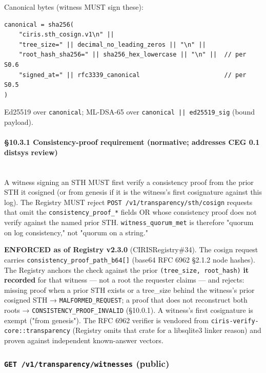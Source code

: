 \documentclass[11pt]{article}
\begin{document}
Canonical bytes (witness MUST sign these):


\begin{lstlisting}
canonical = sha256(
    "ciris.sth_cosign.v1\n" ||
    "tree_size=" || decimal_no_leading_zeros || "\n" ||
    "root_hash_sha256=" || sha256_hex_lowercase || "\n" ||  // per S0.6
    "signed_at=" || rfc3339_canonical                       // per S0.5
)
\end{lstlisting}

Ed25519 over \texttt{canonical}; ML-DSA-65 over \texttt{canonical || ed25519\_sig} (bound payload).


\paragraph{§10.3.1 Consistency-proof requirement (normative; addresses CEG 0.1 distsys review)}\mbox{}\\


A witness signing an STH MUST first verify a consistency proof from the prior STH it cosigned (or from genesis if it is the witness's first cosignature against this log). The Registry MUST reject \texttt{POST /v1/transparency/sth/cosign} requests that omit the \texttt{consistency\_proof\_*} fields OR whose consistency proof does not verify against the named prior STH. \texttt{witness\_quorum\_met} is therefore "quorum on log consistency," not "quorum on a string."


\textbf{ENFORCED as of Registry v2.3.0} (CIRISRegistry\#34). The cosign request carries \texttt{consistency\_proof\_path\_b64[]} (base64 RFC 6962 §2.1.2 node hashes). The Registry anchors the check against the prior \texttt{(tree\_size, root\_hash)} \textbf{it recorded} for that witness — not a root the requester claims — and rejects: missing proof when a prior STH exists or a tree\_size behind the witness's prior cosigned STH → \texttt{MALFORMED\_REQUEST}; a proof that does not reconstruct both roots → \texttt{CONSISTENCY\_PROOF\_INVALID} (§10.0.1). A witness's first cosignature is exempt ("from genesis"). The RFC 6962 verifier is vendored from \texttt{ciris-verify-core::transparency} (Registry omits that crate for a libsqlite3 linker reason) and proven against independent known-answer vectors.


\subsubsection*{\texttt{GET /v1/transparency/witnesses} (public)}
\end{document}
